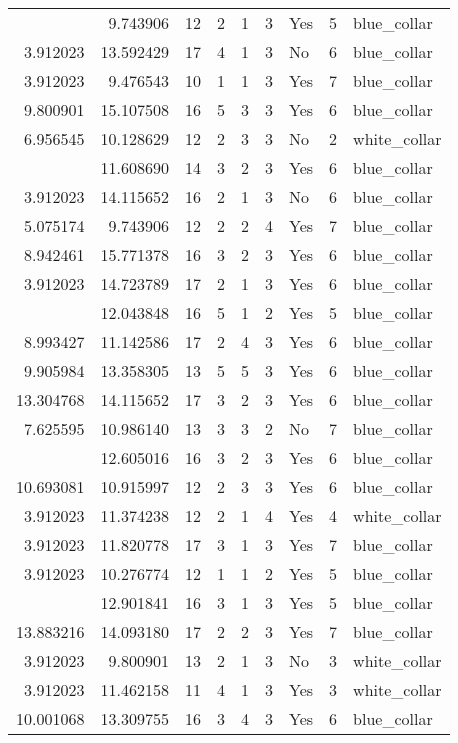 \documentclass[
]{article}
\begin{document}
\begin{longtable}[t]{rrrrrllrl}
\addlinespace
3.912023 & 9.743906 & 12 & 2 & 1 & 3 & Yes & 5 & blue\_collar\\
3.912023 & 13.592429 & 17 & 4 & 1 & 3 & No & 6 & blue\_collar\\
3.912023 & 9.476543 & 10 & 1 & 1 & 3 & Yes & 7 & blue\_collar\\
9.800901 & 15.107508 & 16 & 5 & 3 & 3 & Yes & 6 & blue\_collar\\
6.956545 & 10.128629 & 12 & 2 & 3 & 3 & No & 2 & white\_collar\\
\addlinespace
8.306472 & 11.608690 & 14 & 3 & 2 & 3 & Yes & 6 & blue\_collar\\
3.912023 & 14.115652 & 16 & 2 & 1 & 3 & No & 6 & blue\_collar\\
5.075174 & 9.743906 & 12 & 2 & 2 & 4 & Yes & 7 & blue\_collar\\
8.942461 & 15.771378 & 16 & 3 & 2 & 3 & Yes & 6 & blue\_collar\\
3.912023 & 14.723789 & 17 & 2 & 1 & 3 & Yes & 6 & blue\_collar\\
\addlinespace
3.912023 & 12.043848 & 16 & 5 & 1 & 2 & Yes & 5 & blue\_collar\\
8.993427 & 11.142586 & 17 & 2 & 4 & 3 & Yes & 6 & blue\_collar\\
9.905984 & 13.358305 & 13 & 5 & 5 & 3 & Yes & 6 & blue\_collar\\
13.304768 & 14.115652 & 17 & 3 & 2 & 3 & Yes & 6 & blue\_collar\\
7.625595 & 10.986140 & 13 & 3 & 3 & 2 & No & 7 & blue\_collar\\
\addlinespace
8.527143 & 12.605016 & 16 & 3 & 2 & 3 & Yes & 6 & blue\_collar\\
10.693081 & 10.915997 & 12 & 2 & 3 & 3 & Yes & 6 & blue\_collar\\
3.912023 & 11.374238 & 12 & 2 & 1 & 4 & Yes & 4 & white\_collar\\
3.912023 & 11.820778 & 17 & 3 & 1 & 3 & Yes & 7 & blue\_collar\\
3.912023 & 10.276774 & 12 & 1 & 1 & 2 & Yes & 5 & blue\_collar\\
\addlinespace
3.912023 & 12.901841 & 16 & 3 & 1 & 3 & Yes & 5 & blue\_collar\\
13.883216 & 14.093180 & 17 & 2 & 2 & 3 & Yes & 7 & blue\_collar\\
3.912023 & 9.800901 & 13 & 2 & 1 & 3 & No & 3 & white\_collar\\
3.912023 & 11.462158 & 11 & 4 & 1 & 3 & Yes & 3 & white\_collar\\
10.001068 & 13.309755 & 16 & 3 & 4 & 3 & Yes & 6 & blue\_collar\\

\end{longtable}
\end{document}
